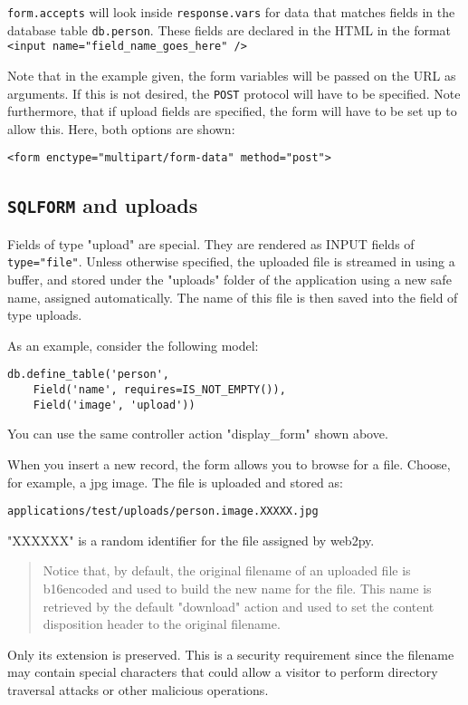 \documentclass[justified,sixbynine,notoc]{tufte-book}
\def\ft{\small\tt}
\def\inxx#1{\index{#1}}
\begin{document}
\begin{fullwidth}
{\ft form.accepts} will look inside {\ft response.vars} for data that matches fields in the database table {\ft db.person}.  These fields are declared in the HTML in the format
{\ft <input name="field\_name\_goes\_here" />}

Note that in the example given, the form variables will be passed on the URL as arguments.  If this is not desired, the {\ft POST} protocol will have to be specified.  Note furthermore, that if upload fields are specified, the form will have to be set up to allow this.  Here, both options are shown:
\begin{lstlisting}[keywords={}]
<form enctype="multipart/form-data" method="post">
\end{lstlisting}

\goodbreak\subsection{{\ft SQLFORM} and uploads}

Fields of type "upload" are special. They are rendered as INPUT fields of {\ft type="file"}. Unless otherwise specified, the uploaded file is streamed in using a buffer, and stored under the "uploads" folder of the application using a new safe name, assigned automatically. The name of this file is then saved into the field of type uploads.

As an example, consider the following model:
\begin{lstlisting}
db.define_table('person',
    Field('name', requires=IS_NOT_EMPTY()),
    Field('image', 'upload'))
\end{lstlisting}

You can use the same controller action "display\_form" shown above.

When you insert a new record, the form allows you to browse for a file.
Choose, for example, a jpg image. The file is uploaded and stored as:
\begin{lstlisting}
applications/test/uploads/person.image.XXXXX.jpg
\end{lstlisting}

"XXXXXX" is a random identifier for the file assigned by web2py.

\inxx{content-disposition}

\begin{quote}Notice that, by default, the original filename of an uploaded file is b16encoded and used to build the new name for the file. This name is retrieved by the default "download" action and used to set the content disposition header to the original filename.\end{quote}
Only its extension is preserved. This is a security requirement since the filename may contain special characters that could allow a visitor to perform directory traversal attacks or other malicious operations.


\end{fullwidth}
\end{document}

